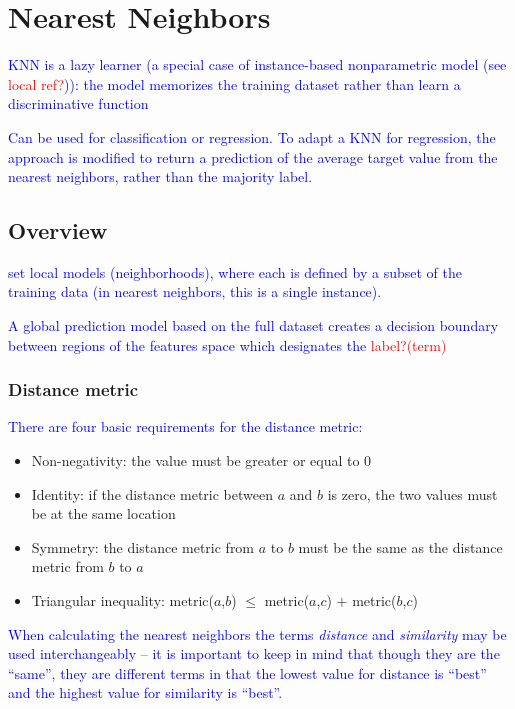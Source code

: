 \section{Nearest Neighbors}

\textcolor{blue}{KNN is a lazy learner (a special case of instance-based nonparametric model (see \textcolor{red}{local ref?})): the model memorizes the training dataset rather than learn a discriminative function}

\textcolor{blue}{Can be used for classification or regression. To adapt a KNN for regression, the approach is modified to return a prediction of the average target value from the nearest neighbors, rather than the majority label.}


\subsection{Overview}



\textcolor{blue}{set local models (neighborhoods), where each is defined by a subset of the training data (in nearest neighbors, this is a single instance).}

\textcolor{blue}{A global prediction model based on the full dataset creates a decision boundary between regions of the features space which designates the \textcolor{red}{label?(term)}}

\subsubsection{Distance metric}

\textcolor{blue}{There are four basic requirements for the distance metric:}

\begin{itemize}
	\item Non-negativity: the value must be greater or equal to 0
	\item Identity: if the distance metric between $a$ and $b$ is zero, the two values must be at the same location
	\item Symmetry: the distance metric from $a$ to $b$ must be the same as the distance metric from $b$ to $a$
	\item Triangular inequality: metric($a$,$b$) $\le$ metric($a$,$c$) $+$ metric($b$,$c$)
\end{itemize}

\textcolor{blue}{When calculating the nearest neighbors the terms \textit{distance} and \textit{similarity} may be used interchangeably -- it is important to keep in mind that though they are the ``same'', they are different terms in that the lowest value for distance is ``best'' and the highest value for similarity is ``best''.}

